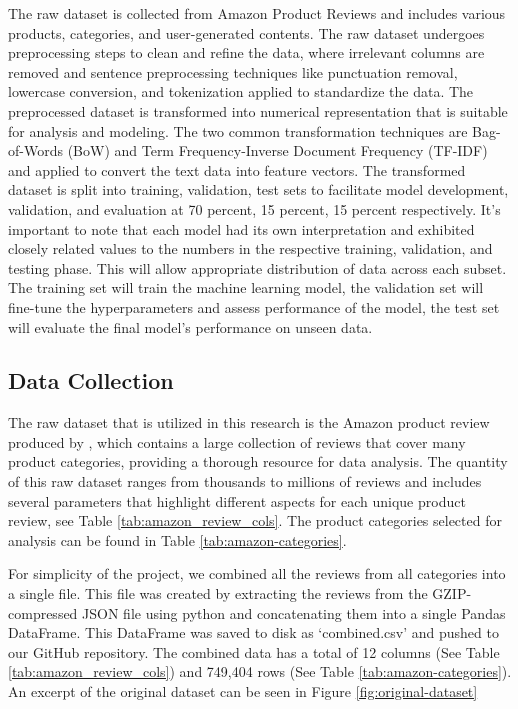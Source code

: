 \documentclass[stu,12pt,floatsintext]{apa7}
\begin{document}
The raw dataset is collected from Amazon Product Reviews and includes various products, categories, and user-generated contents. The raw dataset undergoes preprocessing steps to clean and refine the data, where irrelevant columns are removed and sentence preprocessing techniques like punctuation removal, lowercase conversion, and tokenization applied to standardize the data. The preprocessed dataset is transformed into numerical representation that is suitable for analysis and modeling. The two common transformation techniques are Bag-of-Words (BoW) and Term Frequency-Inverse Document Frequency (TF-IDF) and applied to convert the text data into feature vectors. The transformed dataset is split into training, validation, test sets to facilitate model development, validation, and evaluation at 70 percent, 15 percent, 15 percent respectively. It's important to note that each model had its own interpretation and exhibited closely related values to the numbers in the respective training, validation, and testing phase. This will allow appropriate distribution of data across each subset. The training set will train the machine learning model, the validation set will fine-tune the hyperparameters and assess performance of the model, the test set will evaluate the final model's performance on unseen data. 

\subsection{Data Collection}

The raw dataset that is utilized in this research is the Amazon product review produced by \textcite{ni2019justifying_dataset}, which contains a large collection of reviews that cover many product categories, providing a thorough resource for data analysis. The quantity of this raw dataset ranges from thousands to millions of reviews and includes several parameters that highlight different aspects for each unique product review, see Table \ref{tab:amazon_review_cols}. The product categories selected for analysis can be found in Table \ref{tab:amazon-categories}.

For simplicity of the project, we combined all the reviews from all categories into a single file. This file was created by extracting the reviews from the GZIP-compressed JSON file using python and concatenating them into a single Pandas DataFrame. This DataFrame was saved to disk as `combined.csv' and pushed to our GitHub repository. The combined data has a total of  12 columns (See Table \ref{tab:amazon_review_cols}) and 749,404 rows (See Table \ref{tab:amazon-categories}). An excerpt of the original dataset can be seen in Figure \ref{fig:original-dataset}
\end{document}
